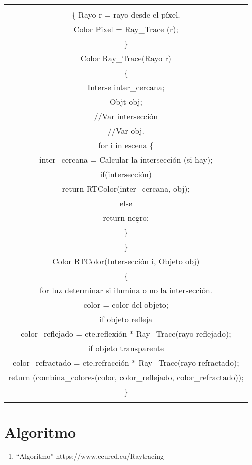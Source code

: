 \documentclass{article}
\begin{document}
\begin{tabular}{|c|}
\hline 
\begin{lstlisting}
    For píxel in pantalla (tam_img)\\
    \{
        Rayo r = rayo desde el píxel.\\
        Color Pixel = Ray_Trace (r);\\
    \}\\
    Color Ray_Trace(Rayo r)\\
    \{\\
        Interse inter_cercana;\\
        Objt obj;\\
        //Var intersección\\
        //Var obj.\\
        for i in escena \{\\
            inter_cercana = Calcular la intersección (si hay);\\
            if(intersección)\\
                return RTColor(inter_cercana, obj);\\
            else\\
                return negro;\\
        \}\\
    \}\\
    Color RTColor(Intersección i, Objeto obj)\\
    \{\\
        for luz determinar si ilumina o no la intersección.\\
        color = color del objeto;\\
        if objeto refleja\\
            color_reflejado = cte.reflexión * Ray_Trace(rayo reflejado);\\
        if objeto transparente\\
            color_refractado = cte.refracción * Ray_Trace(rayo refractado);\\
        return (combina_colores(color, color_reflejado, color_refractado));\\
    \}\\
\end{lstlisting}
 \tabularnewline
\hline 
\end{tabular}

\section{Algoritmo}
\begin{enumerate}
\item ``Algoritmo'' https://www.ecured.cu/Raytracing
\end{enumerate}



\end{document}
